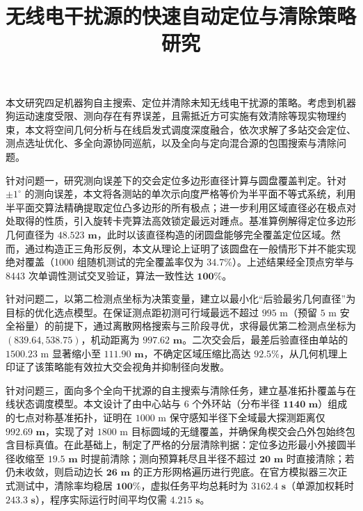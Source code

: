 \documentclass[zihao=-4,a4paper,UTF8]{ctexart}
\title{无线电干扰源的快速自动定位与清除策略研究}
\begin{document}
\maketitle

\begin{cumcmabstract}
\vspace{-0.7em}
\linespread{1.06}\selectfont
本文研究四足机器狗自主搜索、定位并清除未知无线电干扰源的策略。考虑到机器狗运动速度受限、测向存在有界误差，且需抵近方可实施有效清除等现实物理约束，本文将空间几何分析与在线启发式调度深度融合，依次求解了多站交会定位、测点选址优化、多全向源协同巡航，以及全向与定向混合源的包围搜索与清除问题。

针对问题一，研究测向误差下的交会定位多边形直径计算与圆盘覆盖判定。针对 $\pm 1^\circ$ 的测向误差，本文将各测站的单次示向度严格等价为半平面不等式系统，利用半平面交算法精确提取定位凸多边形的所有极点；进一步利用区域直径必在极点对处取得的性质，引入旋转卡壳算法高效锁定最远对踵点。基准算例解得定位多边形几何直径为 $\mathbf{48.523\text{ m}}$，此时以该直径构造的闭圆盘能够完全覆盖定位区域。然而，通过构造正三角形反例，本文从理论上证明了该圆盘在一般情形下并不能实现绝对覆盖（1000 组随机测试的完全覆盖率仅为 $\mathbf{34.7\%}$）。上述结果经全顶点穷举与 8443 次单调性测试交叉验证，算法一致性达 $\mathbf{100\%}$。

针对问题二，以第二检测点坐标为决策变量，建立以最小化“后验最劣几何直径”为目标的优化选点模型。在保证测点距初测可行域最远不超过 $995\text{ m}$（预留 $5\text{ m}$ 安全裕量）的前提下，通过离散网格搜索与三阶段寻优，求得最优第二检测点坐标为 $\mathbf{(839.64, 538.75)}$，机动距离为 $\mathbf{997.62\text{ m}}$。二次交会后，最差后验直径由单站的 $1500.23\text{ m}$ 显著缩小至 $\mathbf{111.90\text{ m}}$，不确定区域压缩比高达 $\mathbf{92.5\%}$，从几何机理上印证了该策略能有效拉大交会视角并抑制径向发散。

针对问题三，面向多个全向干扰源的自主搜索与清除任务，建立基准拓扑覆盖与在线状态调度模型。本文设计了由中心站与 6 个外环站（分布半径 $\mathbf{1140\text{ m}}$）组成的七点对称基准拓扑，证明在 $1000\text{ m}$ 保守感知半径下全域最大探测距离仅 $\mathbf{992.69\text{ m}}$，实现了对 $1800\text{ m}$ 目标圆域的无缝覆盖，并确保角楔交会凸外包始终包含目标真值。在此基础上，制定了严格的分层清除判据：定位多边形最小外接圆半径收缩至 $\mathbf{19.5\text{ m}}$ 时提前清除；测向预算耗尽且半径不超过 $\mathbf{20\text{ m}}$ 时直接清除；若仍未收敛，则启动边长 $\mathbf{26\text{ m}}$ 的正方形网格遍历进行兜底。在官方模拟器三次正式测试中，清除率均稳居 $\mathbf{100\%}$，虚拟任务平均总耗时为 $\mathbf{3162.4\text{ s}}$（单源加权耗时 $\mathbf{243.3\text{ s}}$），程序实际运行时间平均仅需 $\mathbf{4.215\text{ s}}$。


\end{cumcmabstract}
\end{document}
